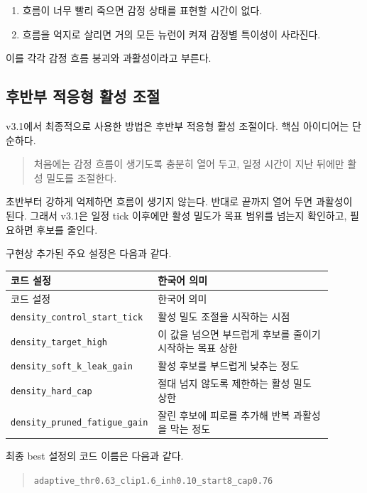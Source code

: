 \documentclass[11pt,a4paper]{article}
\begin{document}
\begin{enumerate}
  \item 흐름이 너무 빨리 죽으면 감정 상태를 표현할 시간이 없다.
  \item 흐름을 억지로 살리면 거의 모든 뉴런이 켜져 감정별 특이성이 사라진다.
\end{enumerate}

이를 각각 감정 흐름 붕괴와 과활성이라고 부른다.

\subsection{후반부 적응형 활성 조절}

v3.1에서 최종적으로 사용한 방법은 후반부 적응형 활성 조절이다. 핵심 아이디어는 단순하다.

\begin{quote}
처음에는 감정 흐름이 생기도록 충분히 열어 두고, 일정 시간이 지난 뒤에만 활성 밀도를 조절한다.
\end{quote}

초반부터 강하게 억제하면 흐름이 생기지 않는다. 반대로 끝까지 열어 두면 과활성이 된다. 그래서 v3.1은 일정 tick 이후에만 활성 밀도가 목표 범위를 넘는지 확인하고, 필요하면 후보를 줄인다.

구현상 추가된 주요 설정은 다음과 같다.

\begin{longtable}{p{0.35\linewidth}p{0.55\linewidth}}
\toprule
코드 설정 & 한국어 의미 \\
\midrule
\endfirsthead
\toprule
코드 설정 & 한국어 의미 \\
\midrule
\endhead
\texttt{density\_control\_start\_tick} & 활성 밀도 조절을 시작하는 시점 \\
\texttt{density\_target\_high} & 이 값을 넘으면 부드럽게 후보를 줄이기 시작하는 목표 상한 \\
\texttt{density\_soft\_k\_leak\_gain} & 활성 후보를 부드럽게 낮추는 정도 \\
\texttt{density\_hard\_cap} & 절대 넘지 않도록 제한하는 활성 밀도 상한 \\
\texttt{density\_pruned\_fatigue\_gain} & 잘린 후보에 피로를 추가해 반복 과활성을 막는 정도 \\
\bottomrule
\end{longtable}

최종 best 설정의 코드 이름은 다음과 같다.

\begin{quote}
\texttt{adaptive\_thr0.63\_clip1.6\_inh0.10\_start8\_cap0.76}
\end{quote}
\end{document}
